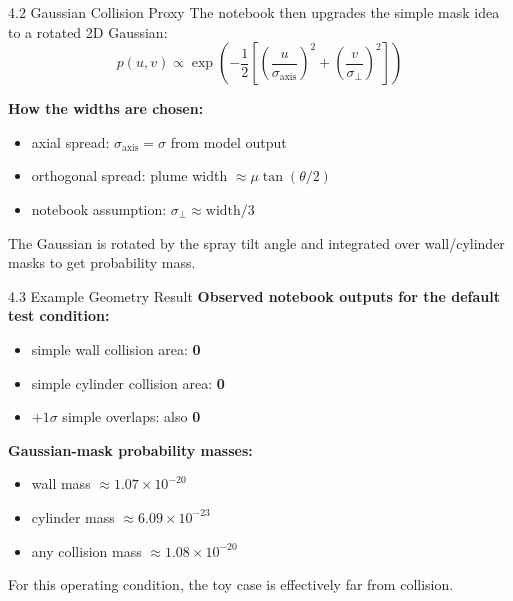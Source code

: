 \documentclass[UTF8,aspectratio=169]{ctexbeamer}
\begin{document}
\begin{frame}{4.2 Gaussian Collision Proxy}
The notebook then upgrades the simple mask idea to a rotated 2D Gaussian:
\[
p(u,v) \propto
\exp\!\left(
-\frac{1}{2}\left[
\left(\frac{u}{\sigma_{\text{axis}}}\right)^2 +
\left(\frac{v}{\sigma_{\perp}}\right)^2
\right]
\right)
\]

\vspace{0.3em}
\textbf{How the widths are chosen:}
\begin{itemize}
  \item axial spread: $\sigma_{\text{axis}} = \sigma$ from model output
  \item orthogonal spread: plume width $\approx \mu \tan(\theta/2)$
  \item notebook assumption: $\sigma_{\perp} \approx \text{width}/3$
\end{itemize}

\vspace{0.3em}
The Gaussian is rotated by the spray tilt angle and integrated over wall/cylinder masks to get probability mass.
\end{frame}

\begin{frame}{4.3 Example Geometry Result}
\textbf{Observed notebook outputs for the default test condition:}
\begin{itemize}
  \item simple wall collision area: \textbf{0}
  \item simple cylinder collision area: \textbf{0}
  \item $+1\sigma$ simple overlaps: also \textbf{0}
\end{itemize}

\vspace{0.3em}
\textbf{Gaussian-mask probability masses:}
\begin{itemize}
  \item wall mass $\approx 1.07 \times 10^{-20}$
  \item cylinder mass $\approx 6.09 \times 10^{-23}$
  \item any collision mass $\approx 1.08 \times 10^{-20}$
\end{itemize}

\vspace{0.3em}
For this operating condition, the toy case is effectively far from collision.
\end{frame}
\end{document}
